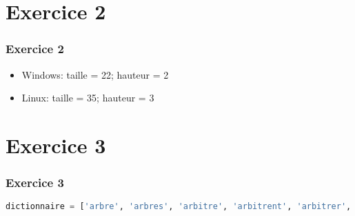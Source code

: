 \documentclass[svgnames,11pt]{beamer}
\begin{document}
\section{Exercice 2}
\begin{frame}
    \frametitle{Exercice 2}
    \begin{itemize}
        \item Windows: taille = 22; hauteur = 2
        \item Linux: taille = 35; hauteur = 3
        \end{itemize}
    

\end{frame}
\section{Exercice 3}
\begin{frame}[fragile]
    \frametitle{Exercice 3}

    \begin{center}
    \begin{lstlisting}[language=Python , basicstyle=\ttfamily\small, xleftmargin=2em, xrightmargin=2em]
dictionnaire = ['arbre', 'arbres', 'arbitre', 'arbitrent', 'arbitrer', 'arbitres', 'arbitrez', 'arbitrons', 'binaire', 'binaires', 'binette', 'binettes', 'bio', 'empile', 'empilent' 'empiler', 'empiles', 'empilez', 'empilons', 'exact', 'exacte', 'exactes', 'exacts']
\end{lstlisting}
    \label{CODE}
    \end{center}

\end{frame}
\end{document}
